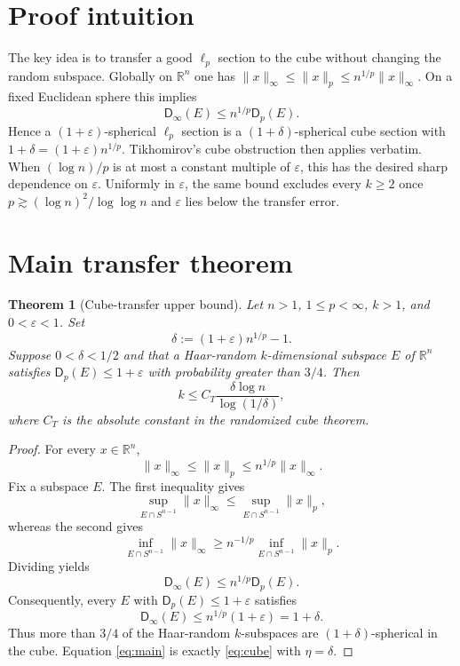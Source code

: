 \documentclass[11pt]{article}
\newtheorem{theorem}{Theorem}
\newcommand{\R}{\mathbb R}
\newcommand{\eps}{\varepsilon}
\newcommand{\Dist}{\mathsf D}
\begin{document}
\section{Proof intuition}

The key idea is to transfer a good $\ell_p$ section to the cube without
changing the random subspace.  Globally on $\R^n$ one has
$\|x\|_\infty\le\|x\|_p\le n^{1/p}\|x\|_\infty$.  On a fixed Euclidean
sphere this implies
\[
   \Dist_\infty(E)\le n^{1/p}\Dist_p(E).
\]
Hence a $(1+\eps)$-spherical $\ell_p$ section is a
$(1+\delta)$-spherical cube section with
$1+\delta=(1+\eps)n^{1/p}$.  Tikhomirov's cube obstruction then applies
verbatim.  When $(\log n)/p$ is at most a constant multiple of $\eps$, this
has the desired sharp dependence on $\eps$.  Uniformly in $\eps$, the same
bound excludes every $k\ge2$ once
$p\gtrsim(\log n)^2/\log\log n$ and $\eps$ lies below the transfer error.

\section{Main transfer theorem}

\begin{theorem}[Cube-transfer upper bound]\label{thm:transfer}
Let $n>1$, $1\le p<\infty$, $k>1$, and $0<\eps<1$.  Set
\begin{equation}\label{eq:delta}
  \delta:=(1+\eps)n^{1/p}-1.
\end{equation}
Suppose $0<\delta<1/2$ and that a Haar-random $k$-dimensional subspace $E$
of $\R^n$ satisfies $\Dist_p(E)\le1+\eps$ with probability greater than
$3/4$.  Then
\begin{equation}\label{eq:main}
  k\le C_T\frac{\delta\log n}{\log(1/\delta)},
\end{equation}
where $C_T$ is the absolute constant in the randomized cube theorem.
\end{theorem}

\begin{proof}
For every $x\in\R^n$,
\begin{equation}\label{eq:normcompare}
 \|x\|_\infty\le\|x\|_p\le n^{1/p}\|x\|_\infty.
\end{equation}
Fix a subspace $E$.  The first inequality gives
\[
 \sup_{E\cap S^{n-1}}\|x\|_\infty
 \le \sup_{E\cap S^{n-1}}\|x\|_p,
\]
whereas the second gives
\[
 \inf_{E\cap S^{n-1}}\|x\|_\infty
 \ge n^{-1/p}\inf_{E\cap S^{n-1}}\|x\|_p.
\]
Dividing yields
\begin{equation}\label{eq:distcompare}
   \Dist_\infty(E)\le n^{1/p}\Dist_p(E).
\end{equation}
Consequently, every $E$ with $\Dist_p(E)\le1+\eps$ satisfies
\[
 \Dist_\infty(E)\le n^{1/p}(1+\eps)=1+\delta.
\]
Thus more than $3/4$ of the Haar-random $k$-subspaces are
$(1+\delta)$-spherical in the cube.  Equation \eqref{eq:main} is exactly
\eqref{eq:cube} with $\eta=\delta$.
\end{proof}
\end{document}
